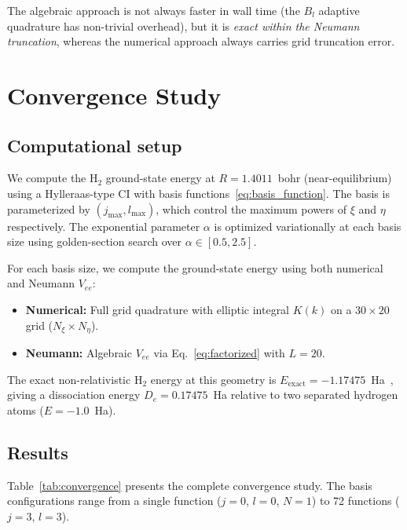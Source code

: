 \documentclass[aps,pra,twocolumn,superscriptaddress,longbibliography]{revtex4-2}
\begin{document}
The algebraic approach is not always faster in wall time
(the $B_l$ adaptive quadrature has non-trivial overhead), but
it is \emph{exact within the Neumann truncation}, whereas
the numerical approach always carries grid truncation error.


\section{Convergence Study}
\label{sec:convergence}

\subsection{Computational setup}

We compute the H$_2$ ground-state energy at $R = 1.4011$~bohr
(near-equilibrium) using a Hylleraas-type CI with basis
functions~\eqref{eq:basis_function}.  The basis is parameterized
by $(j_{\max}, l_{\max})$, which control the maximum powers
of $\xi$ and $\eta$ respectively.  The exponential parameter
$\alpha$ is optimized variationally at each basis size using
golden-section search over $\alpha \in [0.5, 2.5]$.

For each basis size, we compute the ground-state energy using
both numerical and Neumann $V_{ee}$:
\begin{itemize}
  \item \textbf{Numerical:} Full grid quadrature with elliptic
    integral $K(k)$ on a $30 \times 20$ grid ($N_\xi \times N_\eta$).
  \item \textbf{Neumann:} Algebraic $V_{ee}$ via
    Eq.~\eqref{eq:factorized} with $L = 20$.
\end{itemize}

The exact non-relativistic H$_2$ energy at this geometry is
$E_{\mathrm{exact}} = -1.17475$~Ha~\cite{Kolos1968}, giving
a dissociation energy $D_e = 0.17475$~Ha relative to two
separated hydrogen atoms ($E = -1.0$~Ha).

\subsection{Results}

Table~\ref{tab:convergence} presents the complete convergence
study.  The basis configurations range from a single function
($j = 0$, $l = 0$, $N = 1$) to 72 functions ($j = 3$, $l = 3$).
\end{document}

